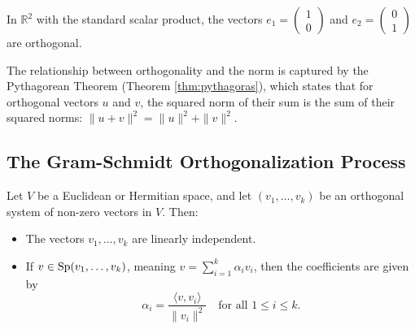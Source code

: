 \begin{example}
    In $\mathbb{R}^2$ with the standard scalar product, the vectors $e_1 = \left(\begin{smallmatrix} 1 \\ 0 \end{smallmatrix}\right)$ and $e_2 = \left(\begin{smallmatrix} 0 \\ 1 \end{smallmatrix}\right)$ are orthogonal.
\end{example}

\begin{remark}
    The relationship between orthogonality and the norm is captured by the Pythagorean Theorem (Theorem \ref{thm:pythagoras}), which states that for orthogonal vectors $u$ and $v$, the squared norm of their sum is the sum of their squared norms: $\|u+v\|^2 = \|u\|^2 + \|v\|^2$.
\end{remark}


\subsection{The Gram-Schmidt Orthogonalization Process}

\begin{theorem}
    Let $V$ be a Euclidean or Hermitian space, and let $(v_1, \dots, v_k)$ be an orthogonal system of non-zero vectors in $V$. Then:
    \begin{itemize}
        \item The vectors $v_1, \dots, v_k$ are linearly independent.
        \item If $v \in \operatorname{Sp}(v_1, \dots, v_k)$, meaning $v = \sum_{i=1}^k \alpha_i v_i$, then the coefficients are given by
        \begin{equation*}
            \alpha_i = \frac{\langle v, v_i \rangle}{\|v_i\|^2} \quad \text{for all } 1 \leq i \leq k.
        \end{equation*}
    \end{itemize}
\end{theorem}


